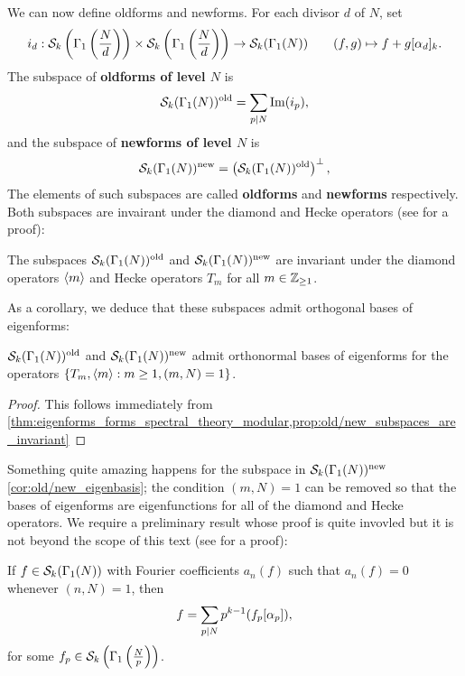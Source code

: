       We can now define oldforms and newforms. For each divisor $d$ of $N$, set
      \[
        i_{d}:\mathcal{S}_{k}\left(\Gamma_{1}\left(\frac{N}{d}\right)\right)\times\mathcal{S}_{k}\left(\Gamma_{1}\left(\frac{N}{d}\right)\right) \to \mathcal{S}_{k}(\Gamma_{1}(N)) \qquad (f,g) \mapsto f+g[\alpha_{d}]_{k}.
      \]
      The subspace of \textbf{oldforms of level $N$} is
      \[
        \mathcal{S}_{k}(\Gamma_{1}(N))^{\mathrm{old}} = \sum_{p \mid N}\mathrm{Im}(i_{p}),
      \]
      and the subspace of \textbf{newforms of level $N$} is
      \[
        \mathcal{S}_{k}(\Gamma_{1}(N))^{\mathrm{new}} = \left(\mathcal{S}_{k}(\Gamma_{1}(N))^{\mathrm{old}} \right)^{\perp},
      \]
      The elements of such subspaces are called \textbf{oldforms} and \textbf{newforms} respectively. Both subspaces are invairant under the diamond and Hecke operators (see \cite{diamond2005first} for a proof):

      \begin{proposition}\label{prop:old/new_subspaces_are_invariant}
        The subspaces $\mathcal{S}_{k}(\Gamma_{1}(N))^{\mathrm{old}}$ and $\mathcal{S}_{k}(\Gamma_{1}(N))^{\mathrm{new}}$ are invariant under the diamond operators $\langle m\rangle$ and Hecke operators $T_{m}$ for all $m \in \mathbb{Z}_{\ge 1}$.
      \end{proposition}

      As a corollary, we deduce that these subspaces admit orthogonal bases of eigenforms:

      \begin{corollary}\label{cor:old/new_eigenbasis}
        $\mathcal{S}_{k}(\Gamma_{1}(N))^{\mathrm{old}}$ and $\mathcal{S}_{k}(\Gamma_{1}(N))^{\mathrm{new}}$ admit orthonormal bases of eigenforms for the operators $\{T_{m},\langle m\rangle:m \ge 1, (m,N) = 1\}$.
      \end{corollary}
      \begin{proof}
        This follows immediately from \cref{thm:eigenforms_forms_spectral_theory_modular,prop:old/new_subspaces_are_invariant}
      \end{proof}

      Something quite amazing happens for the subspace in $\mathcal{S}_{k}(\Gamma_{1}(N))^{\mathrm{new}}$ \cref{cor:old/new_eigenbasis}; the condition $(m,N) = 1$ can be removed so that the bases of eigenforms are eigenfunctions for all of the diamond and Hecke operators. We require a preliminary result whose proof is quite invovled but it is not beyond the scope of this text (see \cite{diamond2005first} for a proof):

      \begin{lemma}\label{lem:the_main_lemma_for_newforms}
        If $f \in \mathcal{S}_{k}(\Gamma_{1}(N))$ with Fourier coefficients $a_{n}(f)$ such that $a_{n}(f) = 0$ whenever $(n,N) = 1$, then
        \[
          f = \sum_{p \mid N}p^{k-1}(f_{p}[\alpha_{p}]),
        \]
        for some $f_{p} \in \mathcal{S}_{k}\left(\Gamma_{1}\left(\frac{N}{p}\right)\right)$.
      \end{lemma}


